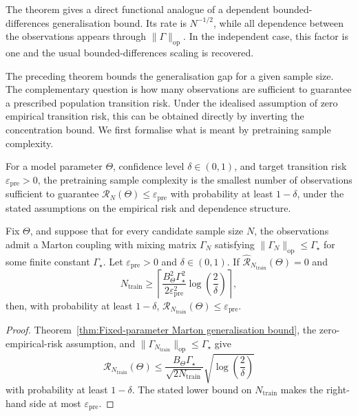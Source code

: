 The theorem gives a direct functional analogue of a dependent bounded-differences generalisation bound. Its rate is \(N^{-1/2}\), while all dependence between the observations appears through \(\|\Gamma\|_{\mathrm{op}}\). In the independent case, this factor is one and the usual bounded-differences scaling is recovered.

The preceding theorem bounds the generalisation gap for a given sample size. The complementary question is how many observations are sufficient to guarantee a prescribed population transition risk. Under the idealised assumption of zero empirical transition risk, this can be obtained directly by inverting the concentration bound.
We first formalise what is meant by pretraining sample complexity.

\begin{definition}
\label{def:Pretraining sample complexity}
For a model parameter \(\Theta\), confidence level \(\delta\in(0,1)\), and target transition risk \(\varepsilon_{\mathrm{pre}}>0\), the pretraining sample complexity is the smallest number of observations sufficient to guarantee
\(
\mathcal R_N(\Theta)
\leqslant
\varepsilon_{\mathrm{pre}}
\)
with probability at least \(1-\delta\), under the stated assumptions on the empirical risk and dependence structure.
\end{definition}

\begin{proposition}
\label{prop:Pretraining sample complexity zero empirical risk}
Fix \(\Theta\), and suppose that for every candidate sample size \(N\), the observations admit a Marton coupling with mixing matrix \(\Gamma_N\) satisfying \(\|\Gamma_N\|_{\mathrm{op}}\leqslant\Gamma_\star\) for some finite constant \(\Gamma_\star\). Let \(\varepsilon_{\mathrm{pre}}>0\) and \(\delta\in(0,1)\). If
\(
\widehat{\mathcal R}_{N_{\mathrm{train}}}(\Theta)=0
\)
and
\[
N_{\mathrm{train}}
\geq
\left\lceil
\frac{
B_\Theta^2\Gamma_\star^2
}{
2\varepsilon_{\mathrm{pre}}^2
}
\log
\left(
\frac2\delta
\right)
\right\rceil,
\]
then, with probability at least \(1-\delta\),
\(
\mathcal R_{N_{\mathrm{train}}}(\Theta)
\leqslant
\varepsilon_{\mathrm{pre}}.
\)
\end{proposition}

\begin{proof}
Theorem~\ref{thm:Fixed-parameter Marton generalisation bound}, the zero-empirical-risk assumption, and \(\|\Gamma_{N_{\mathrm{train}}}\|_{\mathrm{op}}\leqslant\Gamma_\star\) give
\[
\mathcal R_{N_{\mathrm{train}}}(\Theta)
\leqslant
\frac{
B_\Theta\Gamma_\star
}{
\sqrt{2N_{\mathrm{train}}}
}
\sqrt{
\log
\left(
\frac2\delta
\right)
}
\]
with probability at least \(1-\delta\). The stated lower bound on \(N_{\mathrm{train}}\) makes the right-hand side at most \(\varepsilon_{\mathrm{pre}}\).
\end{proof}


